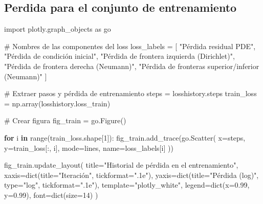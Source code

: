 \documentclass[
  spanish,
  us-letterpaper,
  DIV=11,
  numbers=noendperiod]{scrreprt}
\newenvironment{Shaded}{\begin{snugshade}}{\end{snugshade}}
\newcommand{\BuiltInTok}[1]{\textcolor[rgb]{0.00,0.23,0.31}{#1}}
\newcommand{\CommentTok}[1]{\textcolor[rgb]{0.37,0.37,0.37}{#1}}
\newcommand{\ControlFlowTok}[1]{\textcolor[rgb]{0.00,0.23,0.31}{\textbf{#1}}}
\newcommand{\DecValTok}[1]{\textcolor[rgb]{0.68,0.00,0.00}{#1}}
\newcommand{\FloatTok}[1]{\textcolor[rgb]{0.68,0.00,0.00}{#1}}
\newcommand{\ImportTok}[1]{\textcolor[rgb]{0.00,0.46,0.62}{#1}}
\newcommand{\KeywordTok}[1]{\textcolor[rgb]{0.00,0.23,0.31}{\textbf{#1}}}
\newcommand{\NormalTok}[1]{\textcolor[rgb]{0.00,0.23,0.31}{#1}}
\newcommand{\OperatorTok}[1]{\textcolor[rgb]{0.37,0.37,0.37}{#1}}
\newcommand{\StringTok}[1]{\textcolor[rgb]{0.13,0.47,0.30}{#1}}
\theoremstyle{plain}
\theoremstyle{definition}
\theoremstyle{remark}
\begin{document}
\subsection{Perdida para el conjunto de
entrenamiento}\label{perdida-para-el-conjunto-de-entrenamiento}

\begin{Shaded}
\begin{Highlighting}[]
\ImportTok{import}\NormalTok{ plotly.graph\_objects }\ImportTok{as}\NormalTok{ go}

\CommentTok{\# Nombres de las componentes del loss}
\NormalTok{loss\_labels }\OperatorTok{=}\NormalTok{ [}
    \StringTok{"Pérdida residual PDE"}\NormalTok{,}
    \StringTok{"Pérdida de condición inicial"}\NormalTok{,}
    \StringTok{"Pérdida de frontera izquierda (Dirichlet)"}\NormalTok{,}
    \StringTok{"Pérdida de frontera derecha (Neumann)"}\NormalTok{,}
    \StringTok{"Pérdida de fronteras superior/inferior (Neumann)"}
\NormalTok{]}

\CommentTok{\# Extraer pasos y pérdida de entrenamiento}
\NormalTok{steps }\OperatorTok{=}\NormalTok{ losshistory.steps}
\NormalTok{train\_loss }\OperatorTok{=}\NormalTok{ np.array(losshistory.loss\_train)}

\CommentTok{\# Crear figura}
\NormalTok{fig\_train }\OperatorTok{=}\NormalTok{ go.Figure()}

\ControlFlowTok{for}\NormalTok{ i }\KeywordTok{in} \BuiltInTok{range}\NormalTok{(train\_loss.shape[}\DecValTok{1}\NormalTok{]):}
\NormalTok{    fig\_train.add\_trace(go.Scatter(}
\NormalTok{        x}\OperatorTok{=}\NormalTok{steps,}
\NormalTok{        y}\OperatorTok{=}\NormalTok{train\_loss[:, i],}
\NormalTok{        mode}\OperatorTok{=}\StringTok{\textquotesingle{}lines\textquotesingle{}}\NormalTok{,}
\NormalTok{        name}\OperatorTok{=}\NormalTok{loss\_labels[i]}
\NormalTok{    ))}

\NormalTok{fig\_train.update\_layout(}
\NormalTok{    title}\OperatorTok{=}\StringTok{"Historial de pérdida en el entrenamiento"}\NormalTok{,}
\NormalTok{    xaxis}\OperatorTok{=}\BuiltInTok{dict}\NormalTok{(title}\OperatorTok{=}\StringTok{"Iteración"}\NormalTok{, tickformat}\OperatorTok{=}\StringTok{".1e"}\NormalTok{),}
\NormalTok{    yaxis}\OperatorTok{=}\BuiltInTok{dict}\NormalTok{(title}\OperatorTok{=}\StringTok{"Pérdida (log)"}\NormalTok{, }\BuiltInTok{type}\OperatorTok{=}\StringTok{"log"}\NormalTok{, tickformat}\OperatorTok{=}\StringTok{".1e"}\NormalTok{),}
\NormalTok{    template}\OperatorTok{=}\StringTok{"plotly\_white"}\NormalTok{,}
\NormalTok{    legend}\OperatorTok{=}\BuiltInTok{dict}\NormalTok{(x}\OperatorTok{=}\FloatTok{0.99}\NormalTok{, y}\OperatorTok{=}\FloatTok{0.99}\NormalTok{),}
\NormalTok{    font}\OperatorTok{=}\BuiltInTok{dict}\NormalTok{(size}\OperatorTok{=}\DecValTok{14}\NormalTok{)}
\NormalTok{)}
\end{Highlighting}
\end{Shaded}
\end{document}
